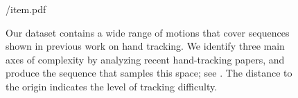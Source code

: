 \begin{figure}[t!]
\centering
\begin{overpic} 
[width=\linewidth]
{\currfiledir/item.pdf}
\end{overpic}
\caption{
% 
Our dataset contains a wide range of motions that cover sequences shown in previous work on hand tracking. We identify three main axes of complexity by analyzing recent hand-tracking papers, and produce the  sequence that samples this space; see \VideoSpace{}. The distance to the origin indicates the level of tracking difficulty.
% 
}
\label{fig:motiontypes}
\end{figure}